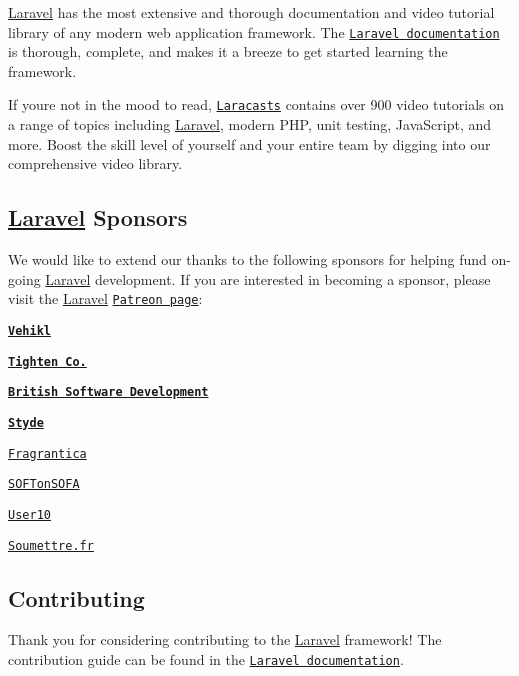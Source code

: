 \mbox{\hyperlink{namespace_laravel}{Laravel}} has the most extensive and thorough documentation and video tutorial library of any modern web application framework. The \href{https://laravel.com/docs}{\tt Laravel documentation} is thorough, complete, and makes it a breeze to get started learning the framework.

If you\textquotesingle{}re not in the mood to read, \href{https://laracasts.com}{\tt Laracasts} contains over 900 video tutorials on a range of topics including \mbox{\hyperlink{namespace_laravel}{Laravel}}, modern P\+HP, unit testing, Java\+Script, and more. Boost the skill level of yourself and your entire team by digging into our comprehensive video library.

\subsection*{\mbox{\hyperlink{namespace_laravel}{Laravel}} Sponsors}

We would like to extend our thanks to the following sponsors for helping fund on-\/going \mbox{\hyperlink{namespace_laravel}{Laravel}} development. If you are interested in becoming a sponsor, please visit the \mbox{\hyperlink{namespace_laravel}{Laravel}} \href{http://patreon.com/taylorotwell}{\tt Patreon page}\+:


\begin{DoxyItemize}
\item {\bfseries \href{http://vehikl.com}{\tt Vehikl}}
\item {\bfseries \href{https://tighten.co}{\tt Tighten Co.}}
\item {\bfseries \href{https://www.britishsoftware.co}{\tt British Software Development}}
\item {\bfseries \href{https://styde.net}{\tt Styde}}
\item \href{https://www.fragrantica.com}{\tt Fragrantica}
\item \href{https://softonsofa.com/}{\tt S\+O\+F\+Ton\+S\+O\+FA}
\item \href{https://user10.com}{\tt User10}
\item \href{https://soumettre.fr/}{\tt Soumettre.\+fr}
\end{DoxyItemize}

\subsection*{Contributing}

Thank you for considering contributing to the \mbox{\hyperlink{namespace_laravel}{Laravel}} framework! The contribution guide can be found in the \href{http://laravel.com/docs/contributions}{\tt Laravel documentation}.

